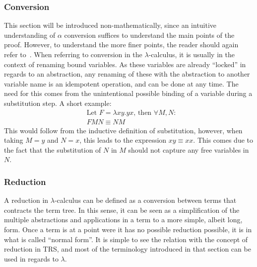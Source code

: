 \documentclass[12pt]{article}
\begin{document}
\subsubsection{Conversion}
This section will be introduced non-mathematically, since an intuitive understanding of $\alpha$ conversion suffices to understand the main points of the proof. However, to understand the more finer points, the reader should again refer to~\cite{barendregt1984lambda}.
When referring to conversion in the $\lambda$-calculus, it is usually in the context of renaming bound variables. As these variables are already \enquote{locked} in regards to an abstraction, any renaming of these with the abstraction to another variable name is an idempotent operation, and can be done at any time.
The need for this comes from the unintentional possible binding of a variable during a substitution step. A short example:
\begin{equation}
  \begin{split}
    & \text{Let } F = \lambda xy.yx \text{, then } \forall M, N: \\
    & FMN \equiv NM
  \end{split}
\end{equation}
This would follow from the inductive definition of substitution, however, when taking $M = y$ and $N = x$, this leads to the expression $xy \equiv xx$.
This comes due to the fact that the substitution of $N$ in $M$ should not capture any free variables in $N$.
\subsubsection{Reduction}\label{reduction}
A reduction in $\lambda$-calculus can be defined as a conversion between terms that contracts the term tree. In this sense, it can be seen as a simplification of the multiple abstractions and applications in a term to a more simple, albeit long, form. Once a term is at a point were it has no possible reduction possible, it is in what is called \enquote{normal form}.
It is simple to see the relation with the concept of reduction in TRS, and most of the terminology introduced in that section can be used in regards to $\lambda$.
\end{document}
